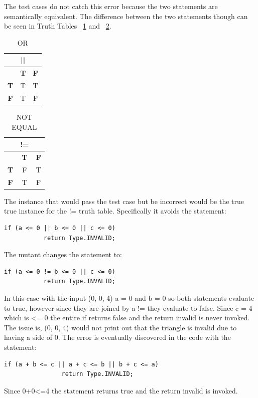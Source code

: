 \documentclass[12pt]{article}
\begin{document}
\par The test cases do not catch this error because the two statements are semantically equivalent. The difference between the two statements though can be seen in Truth Tables ~\ref{or} and ~\ref{notequal}.


\begin{table}[htbp]
\centering
\begin{tabular}{|c||c|c|}
\hline
\bf & \bf \textbf{||} & \bf \\\hline\hline
 & \textbf{T} & \textbf{F}\\\hline
\textbf{T} & T & T\\\hline
\textbf{F} & T & F\\\hline
\end{tabular}
\caption{OR}
\label{or}
\end{table}

\begin{table}[htbp]
\centering
\begin{tabular}{|c||c|c|}
\hline
\bf & \bf \textbf{!=} & \bf \\\hline\hline
 & \textbf{T} & \textbf{F}\\\hline
\textbf{T} & F & T\\\hline
\textbf{F} & T & F\\\hline
\end{tabular}
\caption{NOT EQUAL}
\label{notequal}
\end{table}

The instance that would pass the test case but be incorrect would be the true true instance for the != truth table. Specifically it avoids the statement:
\begin{lstlisting}
if (a <= 0 || b <= 0 || c <= 0)
           return Type.INVALID;
\end{lstlisting}
The mutant changes the statement to:
\begin{lstlisting}
if (a <= 0 != b <= 0 || c <= 0)
           return Type.INVALID;
\end{lstlisting}
In this case with the input (0, 0, 4) a = 0 and b = 0 so both statements evaluate to true, however since they are joined by a != they evaluate to false. Since c = 4 which is <= 0 the entire if returns false and the return invalid is never invoked. The issue is, (0, 0, 4) would not print out that the triangle is invalid due to having a side of 0.  The error is eventually discovered in the code with the statement:
\begin{lstlisting}
if (a + b <= c || a + c <= b || b + c <= a)
				return Type.INVALID;
\end{lstlisting}
Since 0+0<=4 the statement returns true and the return invalid is invoked.
\end{document}

